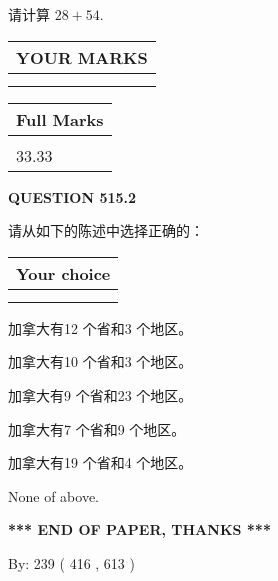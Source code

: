 \documentclass{ctexart}
\begin{document}
  
 
请计算 $ %
28 +  %
54 $.
 

 

 
  
\vspace{0.2in}
  
\noindent\begin{tabular}{|l|}
\hline
 YOUR MARKS  \\
\hline
 \\ 
 \\ 
\hline
\end{tabular}
\hspace{0.05in} \begin{tabular}{|l|}
\hline
 Full Marks  \\
\hline
 \\ 
33.33 \\
\hline
\end{tabular}
{\textbf{\Large{QUESTION
515.2 
}}}
  
  
请从如下的陈述中选择正确的：
  
  
\noindent\hspace{3.0in} \begin{tabular}{|l|}
\hline
Your choice \\
\hline
 \\ 
 \\ 
\hline
\end{tabular}
  
  
 
 
加拿大有12 个省和3 个地区。
 
 
加拿大有10 个省和3 个地区。
 
 
加拿大有9 个省和23 个地区。
 
 
加拿大有7 个省和9 个地区。
 
 
加拿大有19 个省和4 个地区。
 
 
 None of above.
 
 
   
   
 \vspace{0.2in}
 
   
   
   
   
\vspace{1.0in} 
{\textbf{\large{ *** END OF PAPER, THANKS *** }}} 
   
   
\hspace{1.0in} By: 
 239 ( 416 ,  613 )
   
\end{document}
